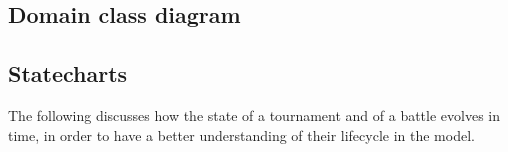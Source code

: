 \subsection{Domain class diagram}
\begin{adjustbox}{
		max size={\textwidth}{},
		center,
		caption={Domain class diagram},
		label={fig:Domain class diagram},
		figure=H}
\end{adjustbox}
\pagebreak

\subsection{Statecharts}

The following discusses how the state of a tournament and of a battle
evolves in time, in order to have a better understanding of their lifecycle
in the model.

